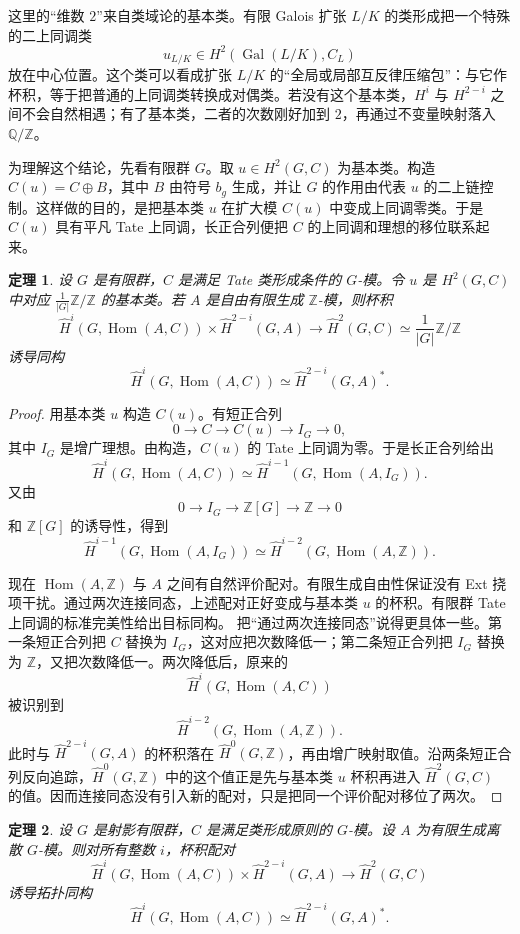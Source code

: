 \documentclass[11pt,a4paper,openany]{ctexbook}
\numberwithin{equation}{chapter}
\newcommand{\Q}{\mathbb{Q}}
\newcommand{\Z}{\mathbb{Z}}
\newcommand{\Gal}{\operatorname{Gal}}
\newcommand{\Hom}{\operatorname{Hom}}
\theoremstyle{plain}
\newtheorem{theorem}{定理}[chapter]
\theoremstyle{definition}
\theoremstyle{remark}
\begin{document}
这里的“维数 $2$”来自类域论的基本类。有限 Galois 扩张 $L/K$ 的类形成把一个特殊的二上同调类
\[
u_{L/K}\in H^2(\Gal(L/K),C_L)
\]
放在中心位置。这个类可以看成扩张 $L/K$ 的“全局或局部互反律压缩包”：与它作杯积，等于把普通的上同调类转换成对偶类。若没有这个基本类，$H^i$ 与 $H^{2-i}$ 之间不会自然相遇；有了基本类，二者的次数刚好加到 $2$，再通过不变量映射落入 $\Q/\Z$。

为理解这个结论，先看有限群 $G$。取 $u\in H^2(G,C)$ 为基本类。构造 $C(u)=C\oplus B$，其中 $B$ 由符号 $b_g$ 生成，并让 $G$ 的作用由代表 $u$ 的二上链控制。这样做的目的，是把基本类 $u$ 在扩大模 $C(u)$ 中变成上同调零类。于是 $C(u)$ 具有平凡 Tate 上同调，长正合列便把 $C$ 的上同调和理想的移位联系起来。

\begin{theorem}
设 $G$ 是有限群，$C$ 是满足 Tate 类形成条件的 $G$-模。令 $u$ 是 $H^2(G,C)$ 中对应 $\frac1{|G|}\Z/\Z$ 的基本类。若 $A$ 是自由有限生成 $\Z$-模，则杯积
\[
\widehat H^i(G,\Hom(A,C))\times \widehat H^{2-i}(G,A)
\longrightarrow \widehat H^2(G,C)\simeq \frac1{|G|}\Z/\Z
\]
诱导同构
\[
\widehat H^i(G,\Hom(A,C))\simeq \widehat H^{2-i}(G,A)^*.
\]
\end{theorem}

\begin{proof}
用基本类 $u$ 构造 $C(u)$。有短正合列
\[
0\to C\to C(u)\to I_G\to 0,
\]
其中 $I_G$ 是增广理想。由构造，$C(u)$ 的 Tate 上同调为零。于是长正合列给出
\[
\widehat H^i(G,\Hom(A,C))\simeq
\widehat H^{i-1}(G,\Hom(A,I_G)).
\]
又由
\[
0\to I_G\to \Z[G]\to \Z\to 0
\]
和 $\Z[G]$ 的诱导性，得到
\[
\widehat H^{i-1}(G,\Hom(A,I_G))
\simeq \widehat H^{i-2}(G,\Hom(A,\Z)).
\]

现在 $\Hom(A,\Z)$ 与 $A$ 之间有自然评价配对。有限生成自由性保证没有 Ext 挠项干扰。通过两次连接同态，上述配对正好变成与基本类 $u$ 的杯积。有限群 Tate 上同调的标准完美性给出目标同构。
把“通过两次连接同态”说得更具体一些。第一条短正合列把 $C$ 替换为 $I_G$，这对应把次数降低一；第二条短正合列把 $I_G$ 替换为 $\Z$，又把次数降低一。两次降低后，原来的
\[
\widehat H^i(G,\Hom(A,C))
\]
被识别到
\[
\widehat H^{i-2}(G,\Hom(A,\Z)).
\]
此时与 $\widehat H^{2-i}(G,A)$ 的杯积落在 $\widehat H^0(G,\Z)$，再由增广映射取值。沿两条短正合列反向追踪，$\widehat H^0(G,\Z)$ 中的这个值正是先与基本类 $u$ 杯积再进入 $\widehat H^2(G,C)$ 的值。因而连接同态没有引入新的配对，只是把同一个评价配对移位了两次。
\end{proof}

\begin{theorem}
设 $G$ 是射影有限群，$C$ 是满足类形成原则的 $G$-模。设 $A$ 为有限生成离散 $G$-模。则对所有整数 $i$，杯积配对
\[
\widehat H^i(G,\Hom(A,C))\times \widehat H^{2-i}(G,A)
\longrightarrow \widehat H^2(G,C)
\]
诱导拓扑同构
\[
\widehat H^i(G,\Hom(A,C))\simeq \widehat H^{2-i}(G,A)^*.
\]
\end{theorem}
\end{document}

